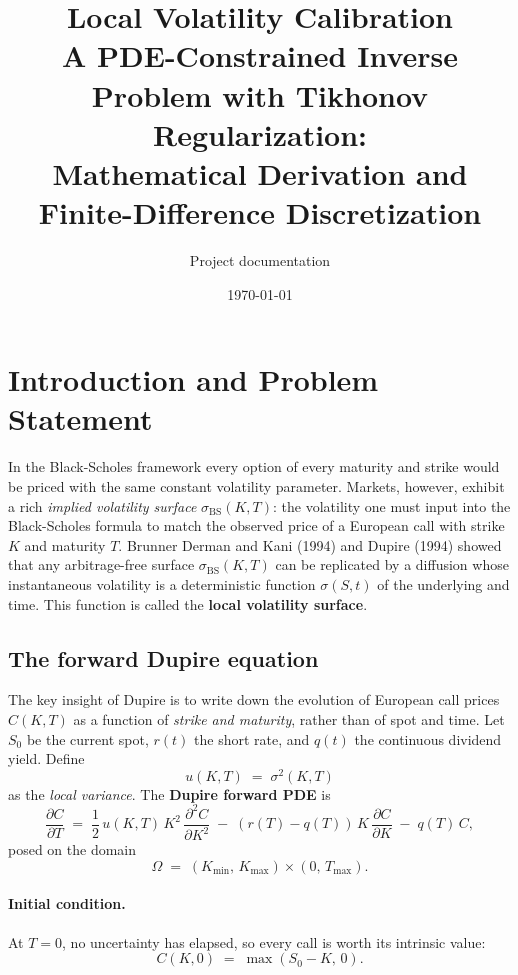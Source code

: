 \documentclass[11pt, a4paper]{article}
\title{%
  \textbf{Local Volatility Calibration} \\[6pt]
  \large A PDE-Constrained Inverse Problem with Tikhonov Regularization:\\
  Mathematical Derivation and Finite-Difference Discretization
}
\author{Project documentation}
\date{\today}
\newcommand{\pder}[2]{\frac{\partial #1}{\partial #2}}
\newcommand{\pderII}[2]{\frac{\partial^2 #1}{\partial #2^2}}
\newcommand{\Omg}{\Omega}
\theoremstyle{definition}
\theoremstyle{plain}
\begin{document}
\maketitle
\tableofcontents
\newpage

\section{Introduction and Problem Statement}

In the Black-Scholes framework every option of every maturity and strike
would be priced with the same constant volatility parameter. Markets,
however, exhibit a rich \emph{implied volatility surface}
$\sigma_\text{BS}(K, T)$: the volatility one must input into the
Black-Scholes formula to match the observed price of a European call with
strike $K$ and maturity $T$. Brunner Derman and Kani (1994) and Dupire (1994)
showed that any arbitrage-free surface $\sigma_\text{BS}(K, T)$ can be
replicated by a diffusion whose instantaneous volatility is a deterministic
function $\sigma(S, t)$ of the underlying and time. This function is called
the \textbf{local volatility surface}.

\subsection{The forward Dupire equation}

The key insight of Dupire is to write down the evolution of European call
prices $C(K, T)$ as a function of \emph{strike and maturity}, rather than of
spot and time. Let $S_0$ be the current spot, $r(t)$ the short rate, and
$q(t)$ the continuous dividend yield. Define
\[
  u(K, T) \;=\; \sigma^2(K, T)
\]
as the \emph{local variance}. The \textbf{Dupire forward PDE} is
\begin{equation}\label{eq:dupire}
  \pder{C}{T}
  \;=\;
  \frac{1}{2}\,u(K,T)\,K^2\,\pderII{C}{K}
  \;-\; (r(T)-q(T))\,K\,\pder{C}{K}
  \;-\; q(T)\,C,
\end{equation}
posed on the domain
\[
  \Omg \;=\; (K_{\min},\, K_{\max}) \times (0,\, T_{\max}).
\]

\paragraph{Initial condition.}
At $T = 0$, no uncertainty has elapsed, so every call is worth its
intrinsic value:
\begin{equation}\label{eq:ic}
  C(K, 0) \;=\; \max(S_0 - K,\, 0).
\end{equation}
\end{document}
